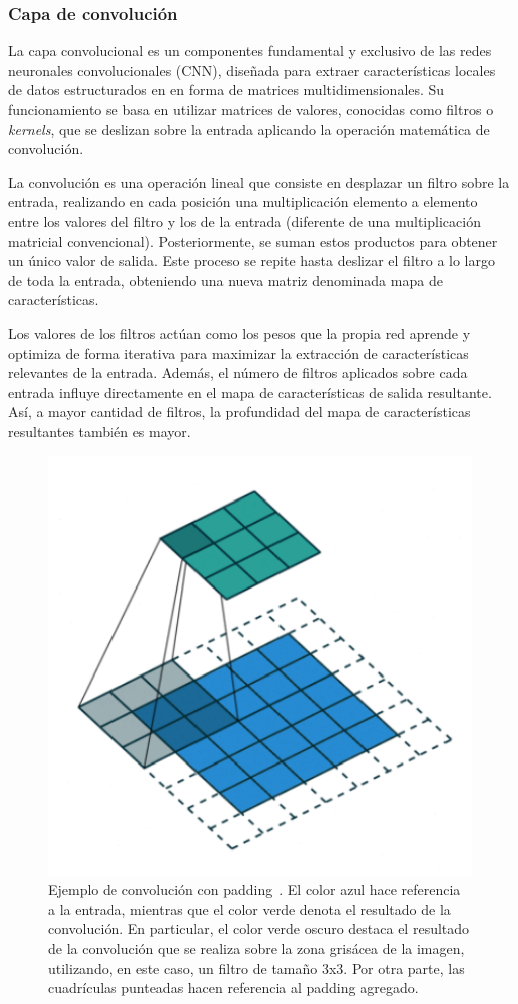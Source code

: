 \subsubsection{Capa de convolución}

La capa convolucional es un componentes fundamental y exclusivo de las redes neuronales convolucionales (CNN), diseñada para extraer características locales de datos estructurados en en forma de matrices multidimensionales. Su funcionamiento se basa en utilizar matrices de valores, conocidas como filtros o \emph{kernels}, que se deslizan sobre la entrada aplicando la operación matemática de convolución.\newline

La convolución es una operación lineal que consiste en desplazar un filtro sobre la entrada, realizando en cada posición una multiplicación elemento a elemento entre los valores del filtro y los de la entrada (diferente de una multiplicación matricial convencional). Posteriormente, se suman estos productos para obtener un único valor de salida. Este proceso se repite hasta deslizar el filtro a lo largo de toda la entrada, obteniendo una nueva matriz denominada mapa de características.\newline

Los valores de los filtros actúan como los pesos que la propia red aprende y optimiza de forma iterativa para maximizar la extracción de características relevantes de la entrada. Además, el número de filtros aplicados sobre cada entrada influye directamente en el mapa de características de salida resultante. Así, a mayor cantidad de filtros, la profundidad del mapa de características resultantes también es mayor.\newline

\begin{figure}[h]
    \centering
    \includegraphics[width=0.5\linewidth]{img/convolucion.png}
    \caption[Ejemplo de convolución con padding~\cite{Saha2018}.]{Ejemplo de convolución con padding~\cite{Saha2018}. El color azul hace referencia a la entrada, mientras que el color verde denota el resultado de la convolución. En particular, el color verde oscuro destaca el resultado de la convolución que se realiza sobre la zona grisácea de la imagen, utilizando, en este caso, un filtro de tamaño 3x3. Por otra parte, las cuadrículas punteadas hacen referencia al padding agregado.}\label{fig:convolucion}
\end{figure}

